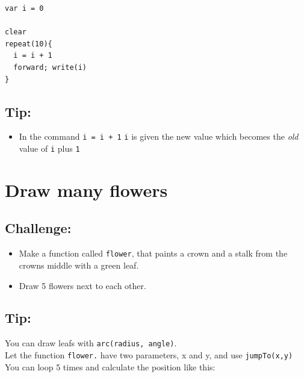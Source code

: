 \begin{lstlisting}[basicstyle={\ttfamily\fontsize{16}{19}\selectfont},numbers=none]
var i = 0

clear
repeat(10){
  i = i + 1
  forward; write(i)
}
\end{lstlisting}
        
\section*{\color{OliveGreen}Tip:}


\begin{itemize}

\item {In the command \lstinline{i = i + 1} \lstinline{i} is given the new value which becomes the {\it old} value of \lstinline{i} plus \lstinline{1}}

\end{itemize}


\chapter{Draw many flowers}\section*{\color{BrickRed}Challenge:}


\begin{itemize}

\item {Make a function called \lstinline{flower}, that paints a crown and a stalk from the crowns middle with a green leaf.}
\item {Draw 5 flowers next to each other.}

\end{itemize}



  
\section*{\color{OliveGreen}Tip:}
You can draw leafs with \lstinline{arc(radius, angle)}. \\
Let the function \lstinline{flower.} have two parameters, x and y, and use \lstinline{jumpTo(x,y)}\\
You can loop 5 times and calculate the position like this:

